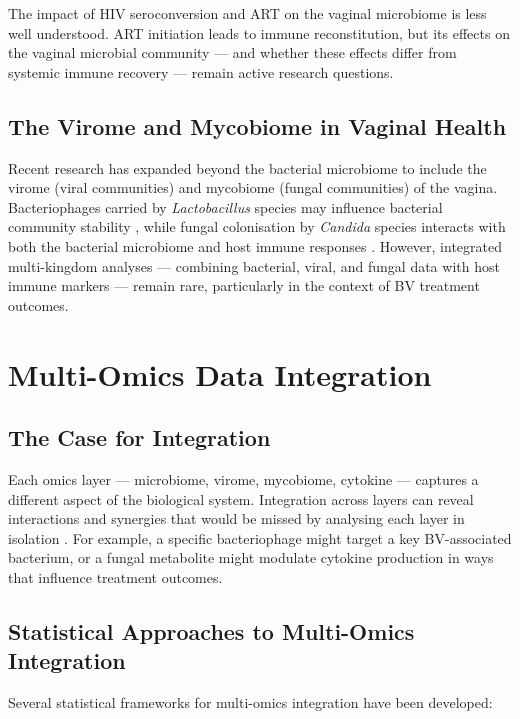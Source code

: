 \documentclass[12pt,a4paper]{report}
\begin{document}
The impact of HIV seroconversion and ART on the vaginal microbiome is less well understood. ART initiation leads to immune reconstitution, but its effects on the vaginal microbial community --- and whether these effects differ from systemic immune recovery --- remain active research questions.

\subsection{The Virome and Mycobiome in Vaginal Health}

Recent research has expanded beyond the bacterial microbiome to include the virome (viral communities) and mycobiome (fungal communities) of the vagina. Bacteriophages carried by \textit{Lactobacillus} species may influence bacterial community stability \cite{vestergaard2022}, while fungal colonisation by \textit{Candida} species interacts with both the bacterial microbiome and host immune responses \cite{bradshaw2015making}. However, integrated multi-kingdom analyses --- combining bacterial, viral, and fungal data with host immune markers --- remain rare, particularly in the context of BV treatment outcomes.

\section{Multi-Omics Data Integration}

\subsection{The Case for Integration}

Each omics layer --- microbiome, virome, mycobiome, cytokine --- captures a different aspect of the biological system. Integration across layers can reveal interactions and synergies that would be missed by analysing each layer in isolation \cite{hasin2017, palsson2022}. For example, a specific bacteriophage might target a key BV-associated bacterium, or a fungal metabolite might modulate cytokine production in ways that influence treatment outcomes.

\subsection{Statistical Approaches to Multi-Omics Integration}

Several statistical frameworks for multi-omics integration have been developed:
\end{document}
